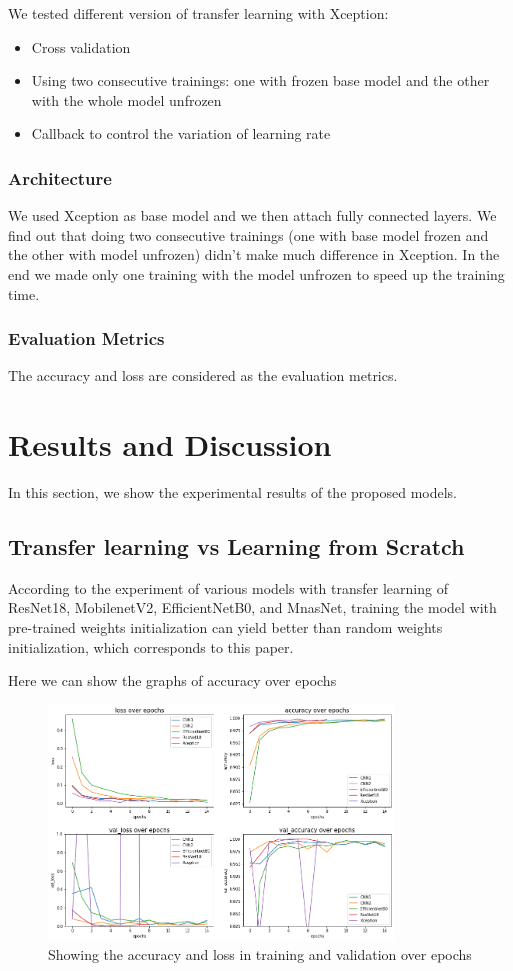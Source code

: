 \documentclass[conference]{IEEEtran}
\begin{document}
We tested different version of transfer learning with Xception:
\begin{itemize}
    \item Cross validation
    \item Using two consecutive trainings: one with frozen base model and the other with the whole model unfrozen
    \item Callback to control the variation of learning rate
\end{itemize}

\subsubsection{Architecture}
We used Xception as base model and we then attach fully connected layers.
We find out that doing two consecutive trainings (one with base model frozen 
and the other with model unfrozen) didn't make much difference in Xception.
In the end we made only one training with the model unfrozen to speed up
the training time.

\subsubsection{Evaluation Metrics}
The accuracy and loss are considered as the evaluation metrics.



\section{Results and Discussion}
In this section, we show the experimental results of the proposed models. 
\subsection{Transfer learning vs Learning from Scratch}
According to the experiment of various models with transfer learning of ResNet18, MobilenetV2, EfficientNetB0, and MnasNet, training the model with pre-trained weights initialization can yield better than random weights initialization, which corresponds to this paper\cite{kornblith2019better}.

Here  we can show the graphs of accuracy over epochs

\begin{figure}[h]
\centering
\includegraphics[width=3.6in]{performance_5.png}
\caption{Showing the accuracy and loss in training and validation over epochs}
\label{bench}
\end{figure}
\end{document}
